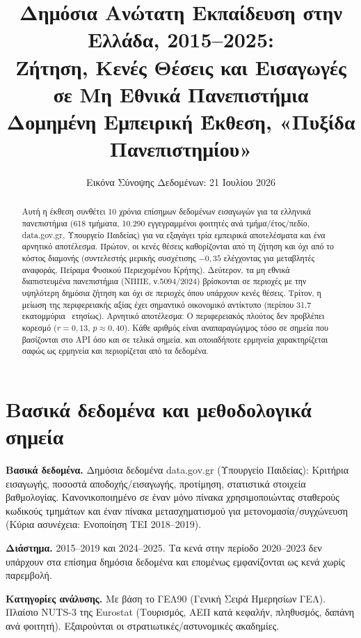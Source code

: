 \documentclass[11pt]{article}
\title{\textbf{Δημόσια Ανώτατη Εκπαίδευση στην Ελλάδα, 2015--2025:\\
Ζήτηση, Κενές Θέσεις και Εισαγωγές σε Μη Εθνικά Πανεπιστήμια}\\[4pt]
\large Δομημένη Εμπειρική Έκθεση, «Πυξίδα Πανεπιστημίου»}
\author{Εικόνα Σύνοψης Δεδομένων: 21 Ιουλίου 2026}
\date{}
\newcommand{\euro}{\texteuro}
\begin{document}
\maketitle

\begin{abstract}
\noindent
Αυτή η έκθεση συνθέτει 10 χρόνια επίσημων δεδομένων εισαγωγών για τα ελληνικά
πανεπιστήμια (618 τμήματα, 10.290 εγγεγραμμένοι φοιτητές ανά τμήμα/έτος/πεδίο,
data.gov.gr, Υπουργείο Παιδείας) για να εξαγάγει τρία εμπειρικά αποτελέσματα και
ένα αρνητικό αποτέλεσμα. Πρώτον, οι κενές θέσεις καθορίζονται από τη ζήτηση και
όχι από το κόστος διαμονής (συντελεστής μερικής συσχέτισης $-0{,}35$ ελέγχοντας
για μεταβλητές αναφοράς, Πείραμα Φυσικού Περιεχομένου Κρήτης). Δεύτερον, τα μη
εθνικά διαπιστευμένα πανεπιστήμια (ΝΠΠΕ, ν.5094/2024) βρίσκονται σε περιοχές με
την υψηλότερη δημόσια ζήτηση και όχι σε περιοχές όπου υπάρχουν κενές θέσεις.
Τρίτον, η μείωση της περιφερειακής αξίας έχει σημαντικό οικονομικό αντίκτυπο
(περίπου 31,7 εκατομμύρια \euro\ ετησίως). Αρνητικό αποτέλεσμα: Ο περιφερειακός
πλούτος δεν προβλέπει κορεσμό ($r=0{,}13$, $p\approx0{,}40$). Κάθε αριθμός είναι
αναπαραγώγιμος τόσο σε σημεία που βασίζονται στο API όσο και σε τελικά σημεία, και
οποιαδήποτε ερμηνεία χαρακτηρίζεται σαφώς ως ερμηνεία και περιορίζεται από τα
δεδομένα.
\end{abstract}

\section{Βασικά δεδομένα και μεθοδολογικά σημεία}

\textbf{Βασικά δεδομένα.} Δημόσια δεδομένα data.gov.gr (Υπουργείο Παιδείας):
Κριτήρια εισαγωγής, ποσοστά αποδοχής/εισαγωγής, προτίμηση, στατιστικά στοιχεία
βαθμολογίας. Κανονικοποιημένο σε έναν μόνο πίνακα χρησιμοποιώντας σταθερούς
κωδικούς τμημάτων και έναν πίνακα μετασχηματισμού για μετονομασία/συγχώνευση
(Κύρια ασυνέχεια: Ενοποίηση ΤΕΙ 2018--2019).

\textbf{Διάστημα.} 2015--2019 και 2024--2025. Τα κενά στην περίοδο 2020--2023 δεν
υπάρχουν στα επίσημα δημόσια δεδομένα και επομένως εμφανίζονται ως κενά χωρίς
παρεμβολή.

\textbf{Κατηγορίες ανάλυσης.} Με βάση το ΓΕΛ90 (Γενική Σειρά Ημερησίων ΓΕΛ).
Πλαίσιο NUTS-3 της Eurostat (Τουρισμός, ΑΕΠ κατά κεφαλήν, πληθυσμός, δαπάνη ανά
φοιτητή). Εξαιρούνται οι στρατιωτικές/αστυνομικές ακαδημίες.
\end{document}
